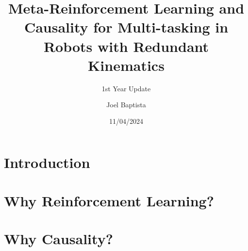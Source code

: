 \documentclass[10pt,xcolor={dvipsnames}]{beamer}
\title[]
{\large Meta-Reinforcement Learning and Causality for Multi-tasking in Robots with Redundant Kinematics}
\subtitle{1st Year Update}
\author[Joel Baptista] %
{Joel Baptista}
\date[2024/04/11] %
{11/04/2024}
\begin{document}
\frame{\titlepage}




\section{Introduction}


\section{Why Reinforcement Learning?}


\section{Why Causality?}





\end{document}
